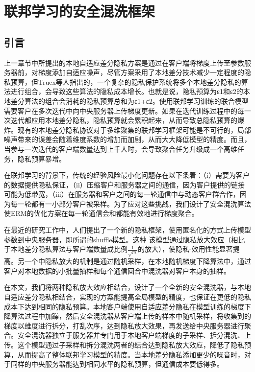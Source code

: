 \chapter{联邦学习的安全混洗框架}
\label{ch4}
\section{引言}
上一章节中所提出的本地自适应差分隐私方案是通过在客户端将梯度上传至参数服务器前，对梯度添加自适应噪声，尽管方案采用了本地差分技术减少一定程度的隐私预算，但Truex等人指出的，一个复杂的隐私保护系统将多个本地差分隐私的算法进行组合，会导致这些算法的隐私成本增长。也就是说，隐私预算为ε1和ε2的本地差分算法的组合会消耗的隐私预算总和为ε1+ε2。使用联邦学习训练的联合模型需要客户在多次迭代中向中央服务器上传梯度更新。如果在迭代训练过程中的每一次迭代都应用本地差分隐私，隐私预算就会累积起来，从而导致总隐私预算的爆炸。现有的本地差分隐私协议对于多维聚集的联邦学习框架可能是不可行的，局部噪声带来的误差会随着维度系数的增加而加剧，从而大大降低模型的精度。而且，当参与一次迭代的客户端数量达到上千人时，会导致聚合任务升级成一个高维任务，隐私预算暴增。

在联邦学习的背景下，传统的经验风险最小化问题存在以下条着：（i）需要为客户的数据提供隐私保证，（ii）压缩客户和服务器之间的通信，因为客户提供的链接可能为低带宽，（iii）在服务器和客户之间的每一轮通信中与动态客户群合作，因为每一轮都有一小部分客户被采样。为了应对这些挑战，我们设计了安全混洗算法使ERM的优化方案在每一轮通信会和都能有效地进行梯度聚合。

在最近的研究工作中，人们提出了一个新的隐私框架，使用匿名化的方式上传模型参数到中央服务器，即所谓的shuffle模型。这种
该模型通过隐私放大效应（相比于本地差分隐私算法与客户端数量成比例$\frac{1}{\sqrt{m}}$的放大），使隐私-效用性能显著提高。另一个中隐私放大的机制是通过随机采样，在本地随机梯度下降算法中，通过客户对本地数据的小批量抽样和每个通信回合中混洗器对客户本身的抽样。

在本文，我们将两种隐私放大效应相结合，设计了一个全新的安全混洗器，与本地自适应差分隐私相结合，实现的方案能提高全局模型的精度，也保证在更低的隐私成本下达到相同的隐私预算。本地客户端使用自适应差分隐私在模型训练的梯度下降算法过程中加躁，然后安全混洗器从客户端上传的样本中随机采样，将收集到的梯度以维度进行拆分，打乱次序，达到隐私放大效果，再发送给中央服务器进行聚合。安全混洗器独立于服务器并专门用于本地客户端梯度的子采样、拆分混洗、上传。这个模型通过子采样和拆分混洗两者的结合达到隐私放大效应，降低了隐私预算，从而提高了整体联邦学习模型的精度。当本地差分隐私添加更少的噪音时，对于同样的中央服务器能达到相同水平的隐私预算，但通信成本要低得多。

